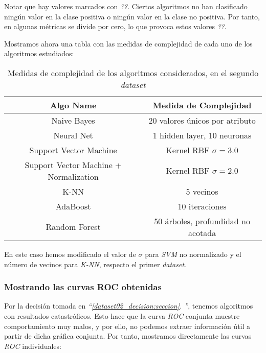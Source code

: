 \documentclass[11pt]{article}
\newcommand{\customcite}[1]{\emph{``\ref{#1}. \nameref{#1}''}}
\begin{document}
Notar que hay valores marcados con \emph{??}. Ciertos algoritmos no han clasificado ningún valor en la clase positiva o ningún valor en la clase no positiva. Por tanto, en algunas métricas se divide por cero, lo que provoca estos valores \emph{??}.

Mostramos ahora una tabla con las medidas de complejidad de cada uno de los algoritmos estudiados:

\begin{table}[H]
\begin{center}
    \begin{tabular}{|c|c|}
        \hline
        Algo Name & Medida de Complejidad \\
        \hline
        Naive Bayes& 20 valores únicos por atributo \\
        Neural Net & 1 hidden layer, 10 neuronas \\
        Support Vector Machine& Kernel RBF $\sigma = 3.0$ \\
        Support Vector Machine + Normalization& Kernel RBF $\sigma = 2.0$ \\
        K-NN& 5 vecinos \\
        AdaBoost& 10 iteraciones \\
        Random Forest& 50 árboles, profundidad no acotada \\
        \hline
    \end{tabular}
\end{center}
    \caption{Medidas de complejidad de los algoritmos considerados, en el segundo \emph{dataset}}
\end{table}

En este caso hemos modificado el valor de $\sigma$ para \emph{SVM} no normalizado y el número de vecinos para \emph{K-NN}, respecto el primer \emph{dataset}.

\pagebreak

\subsubsection{Mostrando las curvas ROC obtenidas}

Por la decisión tomada en \customcite{dataset02_decision:seccion}, tenemos algoritmos con resultados catastróficos. Esto hace que la curva \emph{ROC} conjunta muestre comportamiento muy malos, y por ello, no podemos extraer información útil a partir de dicha gráfica conjunta. Por tanto, mostramos directamente las curvas \emph{ROC} individuales:
\end{document}
